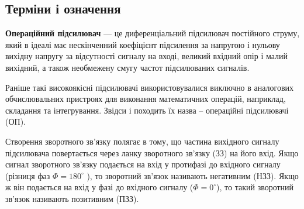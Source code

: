 \documentclass[
  ukrainian,
  14pt
]{extreport}
\begin{document}
\subsection{Терміни і означення}
\textbf{Операційний підсилювач} — це диференціальний підсилювач постійного
струму, який в ідеалі має нескінченний коефіцієнт підсилення за напругою і
нульову вихідну напругу за відсутності сигналу на вході, великий вхідний опір
і малий вихідний, а також необмежену смугу частот підсилюваних сигналів.

Раніше такі високоякісні підсилювачі використовувалися виключно в
аналогових обчислювальних пристроях для виконання математичних
операцій, наприклад, складання та інтегрування. Звідси і походить їх назва –
операційні підсилювачі (ОП).

Створення зворотного зв'язку полягає в тому, що частина вихідного
сигналу підсилювача повертається через ланку зворотного зв'язку (ЗЗ) на
його вхід. Якщо сигнал зворотного зв'язку подається на вхід у протифазі до
вхідного сигналу (різниця фаз $\Phi = 180^\circ$ ), то зворотний зв'язок називають
негативним (НЗЗ). Якщо ж він подається на вхід у фазі до вхідного сигналу
($\Phi = 0^\circ$), то такий зворотний зв'язок називають позитивним (ПЗЗ).
\end{document}
